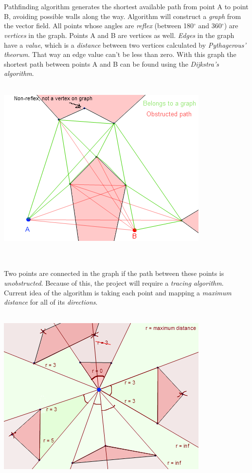 \documentclass[a4paper,12pt]{article}
\begin{document}
\\
\\
\indent Pathfinding algorithm generates the shortest available path from point A to point B,
avoiding possible walls along the way. Algorithm will construct a \emph{graph} from the vector field. All points whose angles are \emph{reflex} (between 180$^\circ$ and 360$^\circ$) are \emph{vertices} in the graph. Points A and B are vertices as well. \emph{Edges} in the graph have a \emph{value}, which is a \emph{distance} between two vertices calculated by \emph{Pythagerous' theorum}. That way an edge value can't be less than zero. With this graph the shortest path between points A and B can be found using the \emph{Dijkstra's algorithm}.
\\
\\
\centerline{\includegraphics[scale=0.65]{graph.png}} \hspace*{\fill}
\\
\\
\indent Two points are connected in the graph if the path between these points is \emph{unobstructed}. Because of this, the project will require a \emph{tracing algorithm}. Current idea of the algorithm is taking each point and mapping a \emph{maximum distance} for all of its \emph{directions}.
\\
\\
\centerline{\includegraphics[scale=0.6]{trace.png}} \hspace*{\fill}
\end{document}
